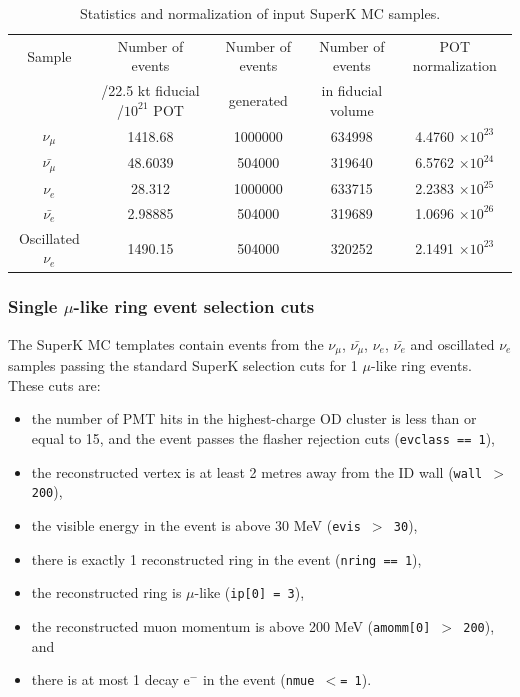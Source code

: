 \begin{table}
\centering
\begin{tabular}{| c | c | c | c | c |}
\hline
Sample             &  Number of events   &  Number of events  & Number of events  & POT normalization \\
                   & /22.5 kt fiducial /$10^{21}$ POT  & generated  & in fiducial volume  &               \\  
\hline             
$\nu_{\mu}$           &         1418.68           &       1000000             &          634998         &    4.4760 $\times 10^{23}$  \\
$\bar{\nu_{\mu}}$  &             48.6039        &         504000             &         319640         &    6.5762  $\times 10^{24}$ \\
$\nu_{e}$              &              28.312         &        1000000            &         633715         &     2.2383  $\times 10^{25}$ \\
$\bar{\nu_{e}}$     &                2.98885      &          504000            &         319689        &     1.0696  $\times 10^{26}$ \\
Oscillated $\nu_{e}$    
                            &             1490.15         &          504000            &         320252        &      2.1491 $\times 10^{23}$ \\
\hline
\end{tabular}
\caption{
  Statistics and normalization of input SuperK MC samples.
}
\label{tab:SKMCSummary}
\end{table}

\subsubsection {Single $\mu$-like ring event selection cuts}
\label{sec:mc_templates:1Rmu_cuts}

The SuperK MC templates contain events from the 
$\nu_{\mu}$, $\bar{\nu_{\mu}}$, $\nu_{e}$, $\bar{\nu_{e}}$ and oscillated $\nu_{e}$ samples
passing the standard SuperK selection cuts for 1 $\mu$-like ring events.
These cuts are:

\begin{itemize}
\item
the number of PMT hits in the highest-charge OD cluster is less than or
equal to 15, and the event passes the flasher rejection cuts
({\tt evclass == 1}),
\item
the reconstructed vertex is at least 2 metres away from the ID wall 
({\tt wall $>$ 200}),
\item
the visible energy in the event is above 30 MeV 
({\tt evis  $>$ 30}),
\item
there is exactly 1 reconstructed ring in the event 
({\tt nring == 1}),
\item
the reconstructed ring is $\mu$-like 
({\tt ip[0] = 3}),
\item
the reconstructed muon momentum is above 200 MeV 
({\tt amomm[0] $>$ 200}), and
\item
there is at most 1 decay e$^{-}$ in the event 
({\tt nmue $<$= 1}).
\end{itemize}

